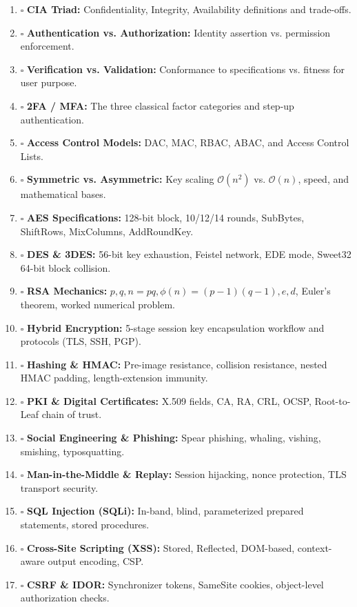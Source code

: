 \begin{enumerate}
\item $\square$ \textbf{CIA Triad:} Confidentiality, Integrity, Availability definitions and trade-offs.
\item $\square$ \textbf{Authentication vs. Authorization:} Identity assertion vs. permission enforcement.
\item $\square$ \textbf{Verification vs. Validation:} Conformance to specifications vs. fitness for user purpose.
\item $\square$ \textbf{2FA / MFA:} The three classical factor categories and step-up authentication.
\item $\square$ \textbf{Access Control Models:} DAC, MAC, RBAC, ABAC, and Access Control Lists.
\item $\square$ \textbf{Symmetric vs. Asymmetric:} Key scaling $\mathcal{O}(n^2)$ vs. $\mathcal{O}(n)$, speed, and mathematical bases.
\item $\square$ \textbf{AES Specifications:} 128-bit block, 10/12/14 rounds, SubBytes, ShiftRows, MixColumns, AddRoundKey.
\item $\square$ \textbf{DES \& 3DES:} 56-bit key exhaustion, Feistel network, EDE mode, Sweet32 64-bit block collision.
\item $\square$ \textbf{RSA Mechanics:} $p, q, n=pq, \phi(n)=(p-1)(q-1), e, d$, Euler's theorem, worked numerical problem.
\item $\square$ \textbf{Hybrid Encryption:} 5-stage session key encapsulation workflow and protocols (TLS, SSH, PGP).
\item $\square$ \textbf{Hashing \& HMAC:} Pre-image resistance, collision resistance, nested HMAC padding, length-extension immunity.
\item $\square$ \textbf{PKI \& Digital Certificates:} X.509 fields, CA, RA, CRL, OCSP, Root-to-Leaf chain of trust.
\item $\square$ \textbf{Social Engineering \& Phishing:} Spear phishing, whaling, vishing, smishing, typosquatting.
\item $\square$ \textbf{Man-in-the-Middle \& Replay:} Session hijacking, nonce protection, TLS transport security.
\item $\square$ \textbf{SQL Injection (SQLi):} In-band, blind, parameterized prepared statements, stored procedures.
\item $\square$ \textbf{Cross-Site Scripting (XSS):} Stored, Reflected, DOM-based, context-aware output encoding, CSP.
\item $\square$ \textbf{CSRF \& IDOR:} Synchronizer tokens, SameSite cookies, object-level authorization checks.

\end{enumerate}
